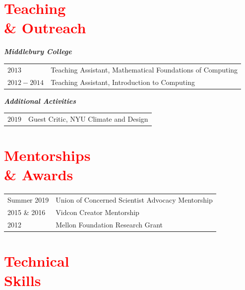 \documentclass[margin,line,palatino,courier,10pt]{res}
\begin{document}
\begin{resume}
\section{\sc \textcolor{Red}{\large{Teaching \\ \& Outreach}}}

\textit{\textbf{Middlebury College}}
\vspace*{0.05in}\\
\begin{tabular}{@{}p{1in}p{4in}}
$2013$ & Teaching Assistant, Mathematical Foundations of Computing \\
$2012 - 2014$ & Teaching Assistant, Introduction to Computing \\
\end{tabular}

\textit{\textbf{Additional Activities}}
\vspace*{0.05in}\\
\begin{tabular}{@{}p{1in}p{4in}}
$2019$ & Guest Critic, NYU Climate and Design \\
\end{tabular}

\section{\sc \textcolor{Red}{\large{Mentorships \\ \& Awards}}}
\vspace*{0.1in}
\begin{tabular}{@{}p{1in}p{4in}}
Summer 2019 & Union of Concerned Scientist Advocacy Mentorship\\
2015 \& 2016 &  Vidcon Creator Mentorship\\
2012 & Mellon Foundation Research Grant\\
\end{tabular}


\section{\sc \textcolor{Red}{\large{Technical \\ Skills}}}
\vspace*{0.05in}
\begin{tabular}{@{}p{.9in}p{6in}}


\end{tabular}
\end{resume}
\end{document}
